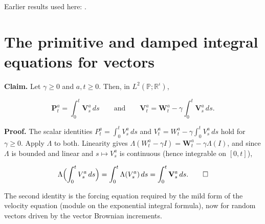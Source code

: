 \documentclass[11pt,a4paper]{article}
\begin{document}
Earlier results used here: \cite[Section~3.8.17]{LangevinLean2026ULASC}.

\section{\texorpdfstring{The primitive and damped integral equations for vectors}{The primitive and damped integral equations for vectors}}


\textbf{Claim.} Let \(\gamma\ge0\) and \(a,t\ge0\). Then, in \(L^2(\mathbb P;\mathbb R^\iota)\),


\[\mathbf P^a_t=\int_0^t\mathbf V^a_s\,ds\qquad\text{and}\qquad\mathbf V^a_t=\mathbf W^a_t-\gamma\int_0^t\mathbf V^a_s\,ds .\]


\textbf{Proof.} The scalar identities \(P^a_t=\int_0^tV^a_s\,ds\) and \(V^a_t=W^a_t-\gamma\int_0^tV^a_s\,ds\) hold for \(\gamma\ge0\). Apply \(\Lambda\) to both. Linearity gives \(\Lambda(W^a_t-\gamma I)=\mathbf W^a_t-\gamma\Lambda(I)\), and since \(\Lambda\) is bounded and linear and \(s\mapsto V^a_s\) is continuous (hence integrable on \([0,t]\)),


\[\Lambda\Bigl(\int_0^tV^a_s\,ds\Bigr)=\int_0^t\Lambda(V^a_s)\,ds=\int_0^t\mathbf V^a_s\,ds .\qquad\square\]


The second identity is the forcing equation required by the mild form of the velocity equation (module on the exponential integral formula), now for random vectors driven by the vector Brownian increments.
\end{document}
